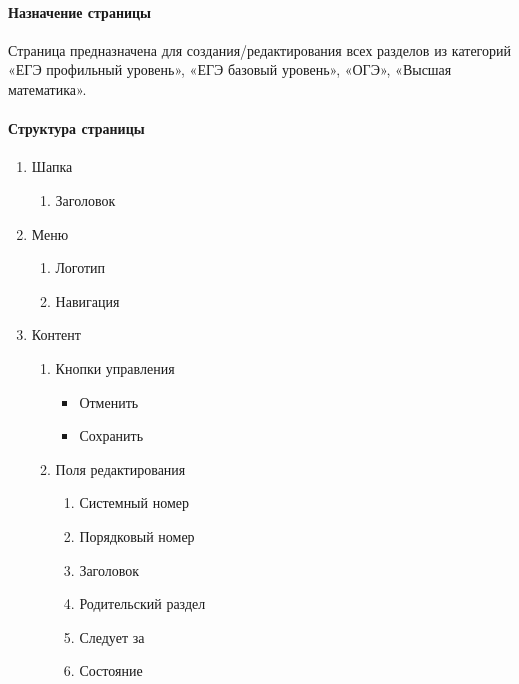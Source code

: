 \paragraph{Назначение страницы}
Страница предназначена для создания/редактирования всех разделов из категорий «ЕГЭ профильный уровень», «ЕГЭ базовый уровень», «ОГЭ», «Высшая математика».

\paragraph{Структура страницы}
\begin{enumerate}
	\item Шапка
	\begin{enumerate}
		\item Заголовок
	\end{enumerate}

	\item Меню
	\begin{enumerate}
		\item Логотип
		\item Навигация
	\end{enumerate}

	\item Контент
	\begin{enumerate}
		\item Кнопки управления
		\begin{itemize}
			\item Отменить
			\item Сохранить
		\end{itemize}

		\item Поля редактирования
		\begin{enumerate}
			\item Системный номер
			\item Порядковый номер
			\item Заголовок
			\item Родительский раздел
			\item Следует за
			\item Состояние
		\end{enumerate}
	\end{enumerate}
\end{enumerate}

